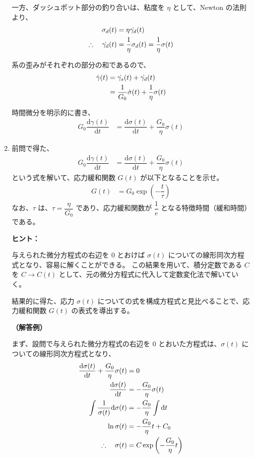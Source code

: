 \documentclass[uplatex,dvipdfmx,a4paper,11pt]{jsarticle}
\newcommand{\diff}{\mathrm d}
\newcommand{\difd}[2]{\dfrac{\diff #1}{\diff #2}}
\begin{document}
\begin{enumerate}
一方、ダッシュポット部分の釣り合いは、粘度を $\eta$ として、Newton の法則より、
\begin{align*}
\sigma_d (t) &= \eta \dot{\gamma_d} (t) \notag \\
\therefore \quad \dot{\gamma_d} (t) &= \dfrac{1}{\eta} \sigma_d (t) = \dfrac{1}{\eta} \sigma (t)
\end{align*}

系の歪みがそれぞれの部分の和であるので、
\begin{align*}
\dot{\gamma} (t) 
	&= \dot{\gamma_s} (t) + \dot{\gamma_d} (t) \notag \\ 
	&= \dfrac{1}{G_0} \dot{\sigma} (t) + \dfrac{1}{\eta} \sigma (t)
\end{align*}

時間微分を明示的に書き、
\begin{align*}
G_0 \difd{\gamma (t)}{t}  
	&= \difd{\sigma (t)}{t} + \dfrac{G_0}{\eta} \sigma (t)
\end{align*}

\vspace{10pt}

\newpage

\item
前問で得た、
\begin{align*}
G_0 \difd{\gamma (t)}{t}  
	&= \difd{\sigma (t)}{t} + \dfrac{G_0}{\eta} \sigma (t)
\end{align*}
という式を解いて、応力緩和関数 $G(t)$ が以下となることを示せ。
\begin{align*}
G(t) 
	&= G_0 \exp \left(-\dfrac{t}{\tau} \right)
\end{align*}
なお、$\tau$ は、$\tau = \dfrac{\eta}{G_0}$ であり、応力緩和関数が $\dfrac{1}{e}$ となる特徴時間（緩和時間）である。

\begin{itembox}[l]{{\bf ヒント：}}

与えられた微分方程式の右辺を 0 とおけば $\sigma(t)$ についての線形同次方程式となり、容易に解くことができる。
この結果を用いて、積分定数である $C$ を $C \rightarrow C (t)$ として、元の微分方程式に代入して定数変化法で解いていく。

結果的に得た、応力 $\sigma(t)$ についての式を構成方程式と見比べることで、応力緩和関数 $G(t)$ の表式を導出する。

\end{itembox}

{\bf （解答例）}

まず、設問で与えられた微分方程式の右辺を 0 とおいた方程式は、$\sigma(t)$ についての線形同次方程式となり、
\begin{align*}
\difd{\sigma (t)}{t} + \dfrac{G_0}{\eta} \sigma (t) &= 0 \notag \\
\difd{\sigma (t)}{t} &= -\dfrac{G_0}{\eta} \sigma (t) \notag \\
\int \dfrac{1}{\sigma (t)} \diff \sigma (t) &= -\dfrac{G_0}{\eta} \int \diff t \notag \\
\ln \sigma (t) &= -\dfrac{G_0}{\eta} t + C_0 \notag \\
\therefore \quad \sigma(t) &= C \exp \left(-\dfrac{G_0}{\eta} t \right)
\end{align*}


\end{enumerate}
\end{document}
